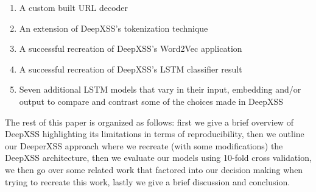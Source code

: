 \begin{enumerate}
    \item A custom built URL decoder
    \item An extension of DeepXSS's tokenization technique
    \item A successful recreation of DeepXSS's Word2Vec application
    \item A successful recreation of DeepXSS's LSTM classifier result
    \item Seven additional LSTM models that vary in their input, embedding and/or output to compare and contrast some of the choices made in DeepXSS
\end{enumerate}

The rest of this paper is organized as follows: first we give a brief overview of DeepXSS highlighting its limitations in terms of reproducibility, then we outline our DeeperXSS approach where we recreate (with some modifications) the DeepXSS architecture, then we evaluate our models using 10-fold cross validation, we then go over some related work that factored into our decision making when trying to recreate this work, lastly we give a brief discussion and conclusion.
